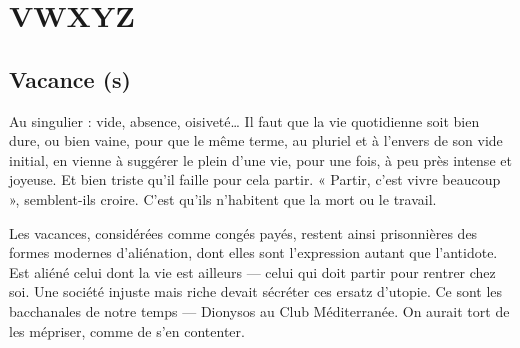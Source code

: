 \chapter{VWXYZ}

\section{Vacance (s)}
Au singulier : vide, absence, oisiveté… Il faut que la vie quotidienne
soit bien dure, ou bien vaine, pour que le même
terme, au pluriel et à l'envers de son vide initial, en vienne à suggérer le plein
d’une vie, pour une fois, à peu près intense et joyeuse. Et bien triste qu’il
faille pour cela partir. « Partir, c’est vivre beaucoup », semblent-ils croire. C’est
qu’ils n’habitent que la mort ou le travail.

Les vacances, considérées comme congés payés, restent ainsi prisonnières
des formes modernes d’aliénation, dont elles sont l'expression autant que l’antidote.
Est aliéné celui dont la vie est ailleurs — celui qui doit partir pour rentrer
chez soi. Une société injuste mais riche devait sécréter ces ersatz d’utopie. Ce
sont les bacchanales de notre temps — Dionysos au Club Méditerranée. On
aurait tort de les mépriser, comme de s’en contenter.

